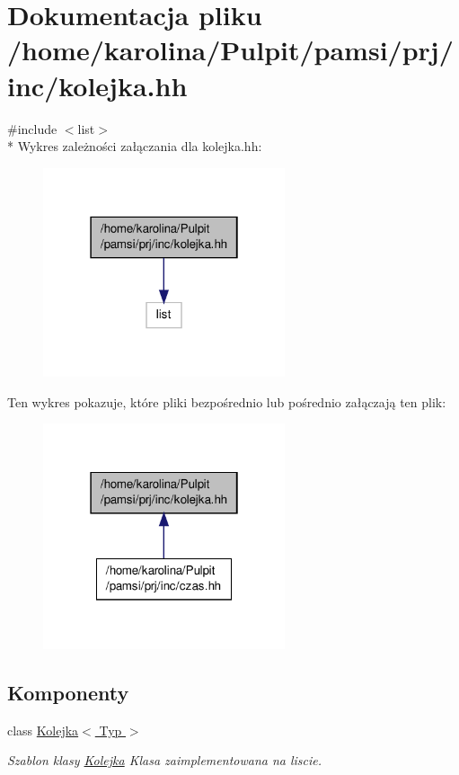 \hypertarget{kolejka_8hh}{\section{Dokumentacja pliku /home/karolina/\-Pulpit/pamsi/prj/inc/kolejka.hh}
\label{kolejka_8hh}
}
{\ttfamily \#include $<$list$>$}\\*
Wykres zależności załączania dla kolejka.\-hh\-:\nopagebreak
\begin{figure}[H]
\begin{center}
\leavevmode
\includegraphics[width=202pt]{kolejka_8hh__incl}
\end{center}
\end{figure}
Ten wykres pokazuje, które pliki bezpośrednio lub pośrednio załączają ten plik\-:
\nopagebreak
\begin{figure}[H]
\begin{center}
\leavevmode
\includegraphics[width=202pt]{kolejka_8hh__dep__incl}
\end{center}
\end{figure}
\subsection*{Komponenty}
\begin{DoxyCompactItemize}
\item 
class \hyperlink{class_kolejka}{Kolejka$<$ Typ $>$}
\begin{DoxyCompactList}\small\item\em Szablon klasy \hyperlink{class_kolejka}{Kolejka} Klasa zaimplementowana na liscie. \end{DoxyCompactList}\end{DoxyCompactItemize}
